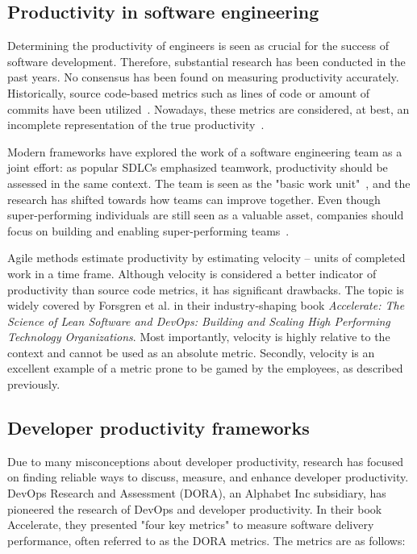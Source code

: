\subsection{Productivity in software engineering}
Determining the productivity of engineers is seen as crucial for the success of software development. Therefore, substantial research has been conducted in the past years.\cite{oliveira_code_2020} No consensus has been found on measuring productivity accurately. Historically, source code-based metrics such as lines of code or amount of commits have been utilized~\cite{oliveira_code_2020}. Nowadays, these metrics are considered, at best, an incomplete representation of the true productivity~\cite{forsgren_space_2021}.

Modern frameworks have explored the work of a software engineering team as a joint effort: as popular SDLCs emphasized teamwork, productivity should be assessed in the same context. The team is seen as the "basic work unit"~\cite{moe_overcoming_2010}, and the research has shifted towards how teams can improve together. Even though super-performing individuals are still seen as a valuable asset, companies should focus on building and enabling super-performing teams~\cite{forsgren_space_2021}. 

Agile methods estimate productivity by estimating velocity – units of completed work in a time frame. Although velocity is considered a better indicator of productivity than source code metrics, it has significant drawbacks. The topic is widely covered by Forsgren et al. in their industry-shaping book \textit{Accelerate: The Science of Lean Software and DevOps: Building and Scaling High Performing Technology Organizations}. Most importantly, velocity is highly relative to the context and cannot be used as an absolute metric. Secondly, velocity is an excellent example of a metric prone to be gamed by the employees, as described previously.~\cite{forsgren_accelerate_2018}
 
\subsection{Developer productivity frameworks}

Due to many misconceptions about developer productivity, research has focused on finding reliable ways to discuss, measure, and enhance developer productivity. DevOps Research and Assessment (DORA), an Alphabet Inc subsidiary, has pioneered the research of DevOps and developer productivity. In their book Accelerate, they presented "four key metrics" to measure software delivery performance, often referred to as the DORA metrics. The metrics are as follows: 

